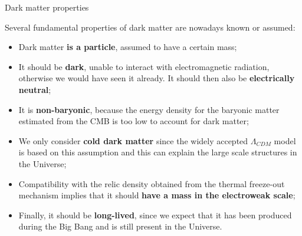 \documentclass[8pt]{beamer}
\begin{document}
\begin{frame}{Dark matter properties}
\justifying

\alert{Several fundamental properties of dark matter} are nowadays known or assumed:

\begin{itemize}
\justifying
\item Dark matter \textbf{is a particle}, assumed to have a certain mass;
\item It should be \textbf{dark}, unable to interact with electromagnetic radiation, otherwise we would have seen it already. It should then also be \textbf{electrically neutral};
\item It is \textbf{non-baryonic}, because the energy density for the baryonic matter estimated from the CMB is too low to account for dark matter;
\item We only consider \textbf{cold dark matter} since the widely accepted $\Lambda_{CDM}$ model is based on this assumption and this can explain the large scale structures in the Universe;
\item Compatibility with the relic density obtained from the thermal freeze-out mechanism implies that it should \textbf{have a mass in the electroweak scale};%
\item Finally, it should be \textbf{long-lived}, since we expect that it has been produced during the Big Bang and is still present in the Universe.
\end{itemize}

\end{frame}
\end{document}
